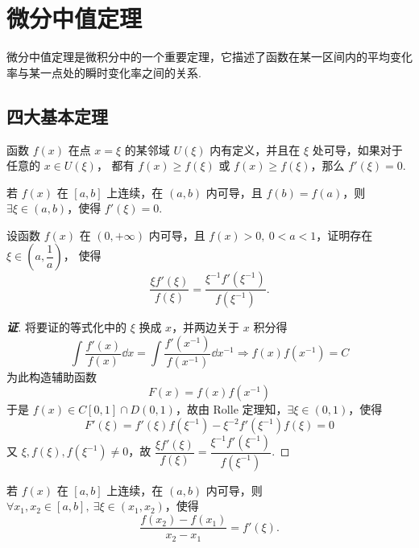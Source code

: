 \section{微分中值定理}

微分中值定理是微积分中的一个重要定理，它描述了函数在某一区间内的平均变化率与某一点处的瞬时变化率之间的关系. 

\subsection{四大基本定理}

\begin{lemma}[Fermat 引理]
    函数 $f(x)$ 在点 $x=\xi$ 的某邻域 $U(\xi)$ 内有定义，并且在 $\xi$ 处可导，如果对于任意的 $x\in U(\xi)$，
    都有 $f(x)\geqslant f(\xi)$ 或 $f(x)\geqslant f(\xi)$，那么 $f'(\xi)=0.$
\end{lemma}

\begin{theorem}[Rolle 定理]
    若 $f(x)$ 在 $[a,b]$ 上连续，在 $(a,b)$ 内可导，且 $f(b)=f(a)$，则 $\exists\xi\in(a,b)$，使得 $f'(\xi)=0.$
\end{theorem}

\begin{example}
    设函数 $f(x)$ 在 $(0,+\infty)$ 内可导，且 $f(x)>0,~0<a<1$，证明存在 $\xi\in\left(a,\dfrac{1}{a}\right)$，
    使得 $$\dfrac{\xi f'(\xi)}{f(\xi)}=\dfrac{\xi^{-1}f'(\xi^{-1})}{f(\xi^{-1})}.$$
\end{example}
\begin{proof}[{\songti \textbf{证}}]
    将要证的等式化中的 $\xi$ 换成 $x$，并两边关于 $x$ 积分得
    $$\int\dfrac{f'(x)}{f(x)}\dd x=\int\dfrac{f'(x^{-1})}{f(x^{-1})}\dd x^{-1}\Rightarrow f(x)f(x^{-1})=C$$
    为此构造辅助函数 $$F(x)=f(x)f(x^{-1})$$
    于是 $f(x)\in C[0,1]\cap D(0,1)$，故由 Rolle 定理知，$\exists\xi\in(0,1)\text{，使得 }$
    $$F'(\xi)=f'(\xi)f(\xi^{-1})-\xi^{-2}f'(\xi^{-1})f(\xi)=0$$
    又 $\xi,f(\xi),f(\xi^{-1})\neq0$，故 $\dfrac{\xi f'(\xi)}{f(\xi)}=\dfrac{\xi^{-1}f'(\xi^{-1})}{f(\xi^{-1})}.$
\end{proof}

\begin{theorem}[Lagrange 定理]
    若 $f(x)$ 在 $[a,b]$ 上连续，在 $(a,b)$ 内可导，则 $\forall x_1,x_2\in[a,b],~\exists\xi\in(x_1,x_2)$，使得
    $$\dfrac{f(x_2)-f(x_1)}{x_2-x_1}=f'(\xi).$$
\end{theorem}

